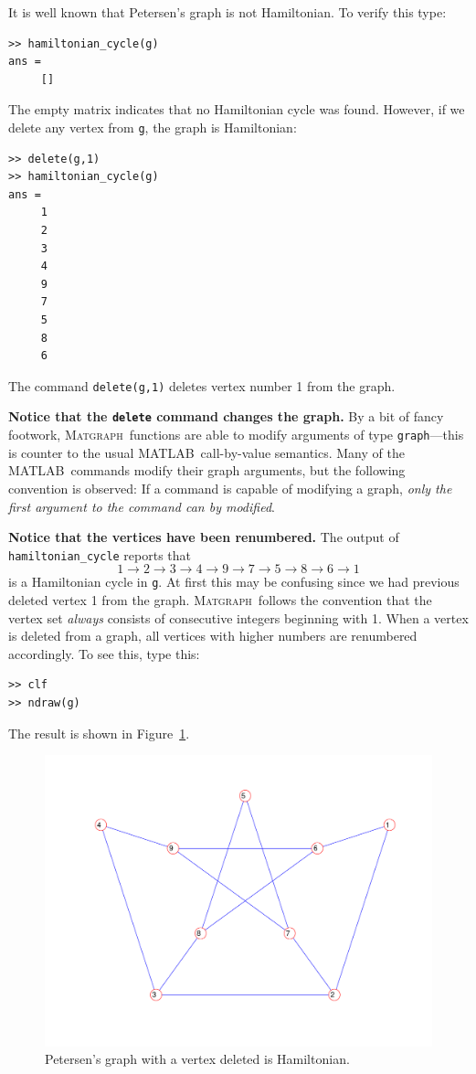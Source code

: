\documentclass[12pt]{amsart}
\newcommand\matlab{MATLAB}
\newcommand\matgraph{\textsc{Matgraph}}
\begin{document}
It is well known that Petersen's graph is not Hamiltonian. To verify
this type:
\begin{verbatim}
>> hamiltonian_cycle(g)
ans =
     []
\end{verbatim}
The empty matrix indicates that no Hamiltonian cycle was
found. However, if we delete any vertex from \verb|g|, the graph is
Hamiltonian:
\begin{verbatim}
>> delete(g,1)
>> hamiltonian_cycle(g)
ans =
     1
     2
     3
     4
     9
     7
     5
     8
     6
\end{verbatim}
The command \verb|delete(g,1)| deletes vertex number 1 from the
graph. 

\textbf{Notice that the \texttt{delete} command changes the graph.} By a
bit of fancy footwork, \matgraph\ functions are able to modify
arguments of type \verb|graph|---this is counter to the usual \matlab\
call-by-value semantics. Many of the \matlab\ commands modify their
graph arguments, but the following convention is observed: If a
command is capable of modifying a graph, \emph{only the first argument
  to the command can by modified}.

\textbf{Notice that the vertices have been renumbered.} The output of
\verb|hamiltonian_cycle| reports that
$$
1 \to 2 \to 3 \to 4 \to 9 \to 7 \to 5 \to 8 \to 6 \to 1
$$ 
is a Hamiltonian cycle in \verb|g|. At first this may be confusing
since we had previous deleted vertex 1 from the graph. \matgraph\
follows the convention that the vertex set \emph{always} consists of
consecutive integers beginning with 1. When a vertex is deleted from a
graph, all vertices with higher numbers are renumbered accordingly. 
To see this, type this:
\begin{verbatim}
>> clf
>> ndraw(g)
\end{verbatim}
The result is shown in Figure~\ref{fig:petersen-vertex}.
\begin{figure}[ht]
  \includegraphics[scale=0.5]{figs/petersen-vertex}
  \caption{Petersen's graph with a vertex deleted is Hamiltonian.}
  \label{fig:petersen-vertex}
\end{figure}
\end{document}
